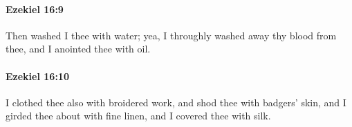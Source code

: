 		\paragraph{Ezekiel 16:9} %
			\label{EZEKIEL-16-9}

			Then washed I thee with water; yea, I throughly washed away thy blood from thee, and I anointed thee with oil.


		\paragraph{Ezekiel 16:10} %
			\label{EZEKIEL-16-10}

			I clothed thee also with broidered work, and shod thee with badgers’ skin, and I girded thee about with fine linen, and I covered thee with silk.


